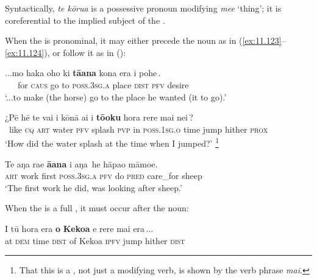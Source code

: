 Syntactically, \textit{te kōrua} is a possessive pronoun modifying \textit{me{\ꞌ}e} ‘thing’; it is coreferential to the implied subject of the . 

When the  is pronominal, it may either precede the noun as in (\ref{ex:11.123}–\ref{ex:11.124}), or follow it as in  ():

\ea\label{ex:11.123}
\gll ...mo haka oho ki \textbf{tā}\textbf{{\ꞌ}}\textbf{ana} kona era {\ob}i pohe\,{\cb}. \\
~~~for \textsc{caus} go to \textsc{poss.3sg.a} place \textsc{dist} {\db}\textsc{pfv} desire \\

\glt 
‘...to make (the horse) go to the place he wanted (it to go).’ \textstyleExampleref{[R345.087]} 
\z

\ea\label{ex:11.124}
\gll ¿Pē hē te vai i kōnā ai {\ꞌ}i \textbf{tō{\ꞌ}oku} hora {\ob}rere mai nei\,{\cb}? \\
~like \textsc{cq} \textsc{art} water \textsc{pfv} splash \textsc{pvp} in \textsc{poss.1sg.o} time {\db}jump hither \textsc{prox} \\

\glt 
‘How did the water splash at the time when I jumped?’ \textstyleExampleref{[R108.125]}\footnote{That this is a , not just a modifying verb, is shown by the verb phrase  \textit{mai}.}
\z



\ea\label{ex:11.125}
\gll Te aŋa ra{\ꞌ}e \textbf{{\ꞌ}ā{\ꞌ}ana} {\ob}i aŋa\,{\cb} he hāpa{\ꞌ}o māmoe. \\
\textsc{art} work first \textsc{poss.3sg.a} {\db}\textsc{pfv} do \textsc{pred} care\_for sheep \\

\glt
‘The first work he did, was looking after sheep.’ \textstyleExampleref{[R487.015]} 
\z

When the  is a full , it must occur after the noun:

\ea\label{ex:11.126}
\gll {\ꞌ}I tū hora era \textbf{o} \textbf{Kekoa} {\ob}e rere mai era\,{\cb}...\\
at \textsc{dem} time \textsc{dist} of Kekoa {\db}\textsc{ipfv} jump hither \textsc{dist}\\

